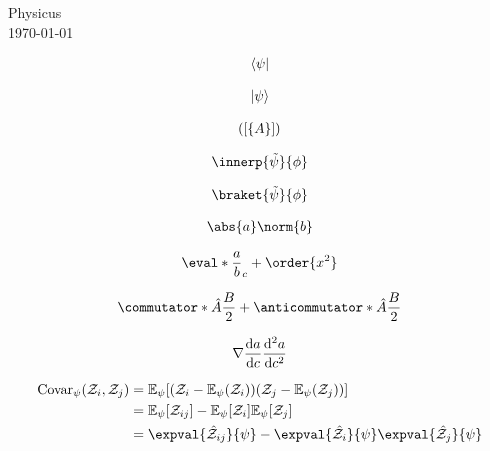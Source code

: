 \documentclass[11pt]{article}
\begin{document}
\begin{center}
  {\Large Physicus} \\ \vspace{5mm}
  \today
\end{center}

\begin{align*}
  \langle\psi\rvert
\end{align*}

\begin{align*}
  \lvert\psi\rangle
\end{align*}

\begin{align*}
  \lparen\lbrack\lbrace A\rbrace\rbrack\rparen
\end{align*}

\begin{align*}
  \innerp{\tilde{\psi}}{\phi}
\end{align*}

\begin{align*}
  \braket{\tilde{\psi}}{\phi}
\end{align*}

\begin{align*}
  \abs{a}\norm{b}
\end{align*}

\begin{align*}
  \eval*{\frac{a}{b}}_c + \order{x^2}
\end{align*}

\begin{align*}
  \commutator*{\hat{A}}{\frac{B}{2}} + \anticommutator*{\hat{A}}{\frac{B}{2}}
\end{align*}

\begin{align*}
  \grad\dv{a}{c}\dv[2]{a}{c}
\end{align*}

\begin{align*}
  \text{Covar}_\psi\pqty{\mathcal{Z}_i,\mathcal{Z}_j}
  & = \mathbb{E}_\psi\bqty{ \pqty{\mathcal{Z}_i - \mathbb{E}_\psi\pqty{ \mathcal{Z}_i}} \pqty{\mathcal{Z}_j - \mathbb{E}_\psi\pqty{ \mathcal{Z}_j}} } \\
  & = \mathbb{E}_\psi\bqty*{\mathcal{Z}_{ij}} - \mathbb{E}_\psi\bqty*{\mathcal{Z}_i}\mathbb{E}_\psi\bqty*{\mathcal{Z}_j}                              \\
  & = \expval{\hat{\mathcal{Z}}_{ij}}{\psi} - \expval{\hat{\mathcal{Z}}_{i}}{\psi}\expval{\hat{\mathcal{Z}}_{j}}{\psi}
\end{align*}
\end{document}
